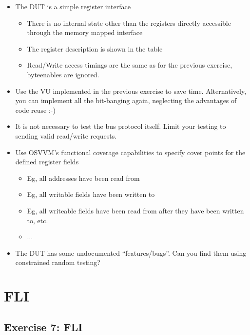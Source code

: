 \documentclass[12pt,epsf,makeidx,oneside]{book}
\begin{document}
  \begin{itemize}[noitemsep]
    \item The DUT is a simple register interface
    \begin{itemize}[noitemsep]
      \item There is no internal state other than the registers directly accessible through the memory mapped interface
      \item The register description is shown in the table
      \item Read/Write access timings are the same as for the previous exercise, byteenables are ignored. 
    \end{itemize}
    \item Use the VU implemented in the previous exercise to save time. Alternatively, you can implement all the bit-banging again, neglecting the advantages of code reuse :-)
    \item It is not necessary to test the bus protocol itself. Limit your testing to sending valid read/write requests.
    \item Use OSVVM's functional coverage capabilities to specify cover points for the defined register fields
    \begin{itemize}[noitemsep]
      \item Eg, all addresses have been read from
      \item Eg, all writable fields have been written to
      \item Eg, all writeable fields have been read from after they have been written to, etc.
      \item ...
    \end{itemize}
    \item The DUT has some undocumented ``features/bugs''. Can you find them using constrained random testing?
  \end{itemize}

\chapter{FLI}
\section{Exercise 7: FLI}
\end{document}
